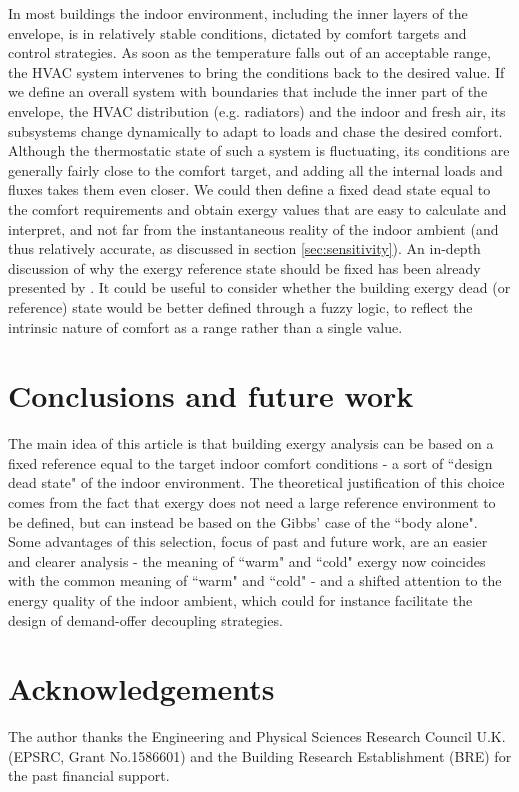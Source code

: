 \documentclass[10pt]{extarticle} %
\begin{document}
In most buildings the indoor environment, including the inner layers of the envelope, is in relatively stable conditions, dictated by comfort targets and control strategies. As soon as the temperature falls out of an acceptable range, the HVAC system intervenes to bring the conditions back to the desired value. If we define an overall system with boundaries that include the inner part of the envelope, the HVAC distribution (e.g. radiators) and the indoor and fresh air, its subsystems change dynamically to adapt to loads and chase the desired comfort. Although the thermostatic state of such a system is fluctuating, its conditions are generally fairly close to the comfort target, and adding all the internal loads and fluxes takes them even closer. We could then define a fixed dead state equal to the comfort requirements and obtain exergy values that are easy to calculate and interpret, and not far from the instantaneous reality of the indoor ambient (and thus relatively accurate, as discussed in section \ref{sec:sensitivity}). An in-depth discussion of why the exergy reference state should be fixed has been already presented by \cite{Pons2019}. It could be useful to consider whether the building exergy dead (or reference) state would be better defined through a fuzzy logic, to reflect the intrinsic nature of comfort as a range rather than a single value.



\section{Conclusions and future work}

The main idea of this article is that building exergy analysis can be based on a fixed reference equal to the target indoor comfort conditions - a sort of ``design dead state" of the indoor environment. The theoretical justification of this choice comes from the fact that exergy does not need a large reference environment to be defined, but can instead be based on the Gibbs' case of the ``body alone". Some advantages of this selection, focus of past and future work, are an easier and clearer analysis - the meaning of ``warm" and ``cold" exergy now coincides with the common meaning of ``warm" and ``cold" - and a shifted attention to the energy quality of the indoor ambient, which could for instance facilitate the design of demand-offer decoupling strategies.


\section*{Acknowledgements}

The author thanks the Engineering and Physical Sciences Research Council U.K. (EPSRC, Grant No.1586601) and the Building Research Establishment (BRE) for the past financial support.

{\small %
 
}

\vfill \break
\end{document}
